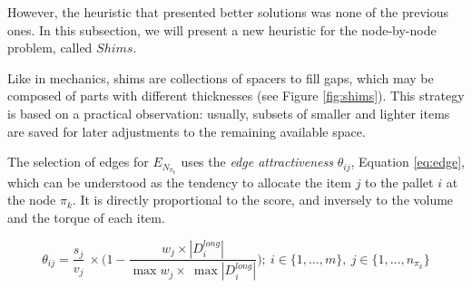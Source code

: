 \documentclass[preprint]{elsarticle}
\begin{document}
However, the heuristic that presented better solutions was none of the previous ones. In this subsection, we will present a new heuristic for the node-by-node problem, called $Shims$.

Like in mechanics, shims are collections of spacers to fill gaps, which may be composed of parts with different thicknesses (see Figure \ref{fig:shims}). This strategy is based on a practical observation: usually, subsets of smaller and lighter items are saved for later adjustments to the remaining available space.

The selection of edges for $E_{ N_{\pi_k} }$ uses the {\it edge attractiveness}\/ $\theta_{ij}$\/, Equation \ref{eq:edge}, which can be understood as the tendency to allocate the item $j$\/ to the pallet $i$\/ at the node $\pi_k$. It is directly proportional to the score, and inversely to the volume and the torque of each item.

\begin{equation} \label{eq:edge}
	\theta_{ij} = \frac{ s_j }{ v_j }\ \times \Big ( 1 - \frac{ w_j \times |D_i^{long}| }{ \max w_j \times\  \max | D_i^{long} | } \Big );\ i \in \{1,\ldots,m\},\ j \in \{1,\ldots,n_{\pi_k}\}
\end{equation} 
\end{document}
